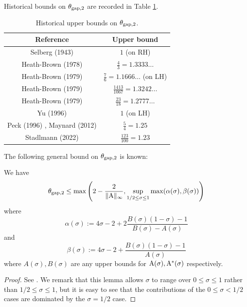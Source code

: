     Historical bounds on $\theta_{\mathrm{gap},2}$ are recorded in Table \ref{gapsquare-table}.

    \begin{table}[ht]
        \caption{Historical upper bounds on $\theta_{\mathrm{gap},2}$.}
        \label{gapsquare-table}
        \centering
        \renewcommand{\arraystretch}{1.2}
        \begin{tabular}{|c|c|}
        \hline
        Reference & Upper bound \\
        \hline
        Selberg (1943) \cite{selberg_1943} & $1$ (on RH)\\
        \hline
        Heath-Brown (1978) \cite{heath_brown_consecutive_I} & $\frac{4}{3} = 1.3333\dots$\\
        \hline
        Heath-Brown (1979) \cite{heath_brown_consecutive_II} & $\frac{7}{6} = 1.1666\dots$ (on LH) \\
        \hline
        Heath-Brown (1979) \cite{heath_brown_consecutive_II} & $\frac{1413}{1067} = 1.3242\dots$ \\
        \hline
        Heath-Brown (1979) \cite{heath_brown_consecutive_III} & $\frac{23}{18} = 1.2777\dots$ \\
        \hline
        Yu (1996) \cite{yu_differences_1996} & $1$ (on LH) \\
        \hline
        Peck (1996) \cite{peck_on_1996}, Maynard (2012) \cite{maynard_difference_2012} & $\frac{5}{4} = 1.25$ \\
        \hline
        Stadlmann (2022) \cite{stadlmann_mean_2022} & $\frac{123}{100} = 1.23$ \\
        \hline
    \end{tabular}
    \end{table}

The following general bound on $\theta_{\mathrm{gap},2}$ is known:

\begin{proposition}\label{gapsquare-from-a}
    We have
    $$ \theta_{\mathrm{gap},2} \leq \max\left( 2-\frac{2}{\|\mathrm{A}\|_\infty}, \sup_{1/2 \leq \sigma \leq 1} \max(\alpha(\sigma), \beta(\sigma))\right)$$
    where
    $$ \alpha(\sigma) := 4\sigma - 2 + 2 \frac{B(\sigma)(1-\sigma)-1}{B(\sigma)-A(\sigma)}$$
    and
    $$ \beta(\sigma) := 4\sigma - 2 + \frac{B(\sigma)(1-\sigma)-1}{A(\sigma)}$$
    where $A(\sigma), B(\sigma)$ are any upper bounds for $\mathrm{A}(\sigma), \mathrm{A}^*(\sigma)$ respectively.
\end{proposition}

\begin{proof} See \cite[Lemma 2]{heath_brown_consecutive_II}. We remark that this lemma allows $\sigma$ to range over $0 \leq \sigma \leq 1$ rather than $1/2 \leq \sigma \leq 1$, but it is easy to see that the contributions of the $0 \leq \sigma < 1/2$ cases are dominated by the $\sigma=1/2$ case.
\end{proof}

